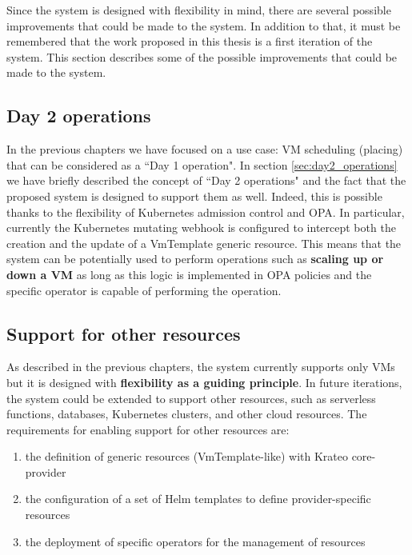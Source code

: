 Since the system is designed with flexibility in mind, there are several possible improvements that could be made to the system.
In addition to that, it must be remembered that the work proposed in this thesis is a first iteration of the system.
This section describes some of the possible improvements that could be made to the system.

\subsection{Day 2 operations}

In the previous chapters we have focused on a use case: VM scheduling (placing) that can be considered as a ``Day 1 operation".
In section \ref{sec:day2_operations} we have briefly described the concept of ``Day 2 operations" and the fact that the proposed system is designed to support them as well.
Indeed, this is possible thanks to the flexibility of Kubernetes admission control and OPA.
In particular, currently the Kubernetes mutating webhook is configured to intercept both the creation and the update of a VmTemplate generic resource.
This means that the system can be potentially used to perform operations such as \textbf{scaling up or down a VM} as long as this logic is implemented in OPA policies and the specific operator is capable of performing the operation.

\subsection{Support for other resources}
\label{sec:support_other_resources}

As described in the previous chapters, the system currently supports only VMs but it is designed with \textbf{flexibility as a guiding principle}.
In future iterations, the system could be extended to support other resources, such as serverless functions, databases, Kubernetes clusters, and other cloud resources.
The requirements for enabling support for other resources are: 
\begin{enumerate}
    \item the definition of generic resources (VmTemplate-like) with Krateo core-provider
    \item the configuration of a set of Helm templates to define provider-specific resources
    \item the deployment of specific operators for the management of resources
\end{enumerate}

